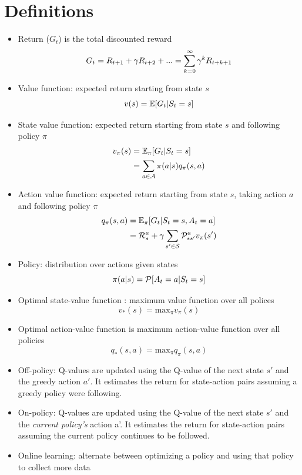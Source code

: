 \documentclass[../main.tex]{subfiles}
\begin{document}
\section{Definitions}
  \begin{itemize}
    \item Return ($G_{t}$) is the total discounted reward
    \begin{equation*}
      G_{t} = R_{t+1} + \gamma R_{t+2} + ... = \sum_{k=0}^{\infty}\gamma^{k}R_{t+k+1}
    \end{equation*}
    \item Value function: expected return starting from state $s$
    \begin{equation*}
      v(s) = \mathbb{E}[G_{t}|S_{t} = s]
    \end{equation*}
    \item State value function: expected return starting from state $s$ and following policy $\pi$
    \begin{align*}
      v_{\pi}(s) &= \mathbb{E_{\pi}}[G_{t}|S_{t} = s] \\
                 &= \sum_{a \in \mathcal{A}} \pi(a|s) q_{\pi}(s,a)
    \end{align*}
    \item Action value function: expected return starting from state $s$, taking action $a$ and following policy $\pi$
    \begin{align*}
      q_{\pi}(s,a) &= \mathbb{E_{\pi}}[G_{t}|S_{t} = s, A_{t} = a] \\
      &= \mathcal{R}_{s}^{a} + \gamma \sum_{s' \in \mathcal{S}} \mathcal{P}_{ss'}^{a} v_{\pi}(s')
    \end{align*}
    \item Policy: distribution over actions given states
    \begin{equation*}
      \pi(a|s) = \mathcal{P}[A_{t} = a | S_{t} = s]
    \end{equation*}
    \item Optimal state-value function : maximum value function over all polices
    \begin{equation*}
      v_{*}(s) = \text{max}_{\pi} v_{\pi}(s)
    \end{equation*}
    \item Optimal action-value function is maximum action-value function over all policies
    \begin{equation*}
      q_{*}(s,a) = \text{max}_{\pi} q_{\pi}(s,a)
    \end{equation*}
    \item Off-policy: Q-values are updated using the Q-value of the next state $s'$ and the greedy action $a'$. It estimates the return for state-action pairs assuming a greedy policy were following.
    \item On-policy: Q-values are updated using the Q-value of the next state $s'$ and the \textit{current policy's} action a'. It estimates the return for state-action pairs assuming the current policy continues to be followed.
    \item Online learning: alternate between optimizing a policy and using that policy to collect more data
  \end{itemize}
\end{document}
